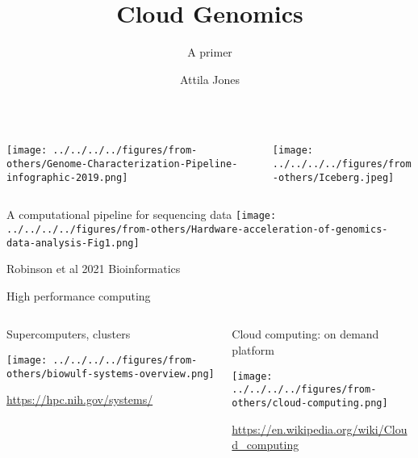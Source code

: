 \documentclass[aspectratio=169]{beamer}
\title{Cloud Genomics}
\subtitle{A primer}
\author{Attila Jones}
\date{}
\begin{document}
\titlepage

\begin{frame}[plain]
\begin{columns}[t]
\begin{column}{0.5\textwidth}
\begin{center}
\texttt{[image: ../../../../figures/from-others/Genome-Characterization-Pipeline-infographic-2019.png]}
\end{center}
\end{column}

\begin{column}{0.5\textwidth}
\begin{center}

\texttt{[image: ../../../../figures/from-others/Iceberg.jpeg]}
\end{center}
\end{column}
\end{columns}
\end{frame}

\begin{frame}{A computational pipeline for sequencing data}
\texttt{[image: ../../../../figures/from-others/Hardware-acceleration-of-genomics-data-analysis-Fig1.png]}

{\tiny Robinson et al 2021 Bioinformatics}
\end{frame}

\begin{frame}{High performance computing}
\begin{columns}[t]
\begin{column}{0.5\textwidth}
  Supercomputers, clusters

\texttt{[image: ../../../../figures/from-others/biowulf-systems-overview.png]}

{\tiny \url{https://hpc.nih.gov/systems/}}
\end{column}

\begin{column}{0.5\textwidth}
  Cloud computing: on demand platform

\texttt{[image: ../../../../figures/from-others/cloud-computing.png]}

{\tiny \url{https://en.wikipedia.org/wiki/Cloud_computing}}
\end{column}
\end{columns}
\end{frame}
\end{document}
